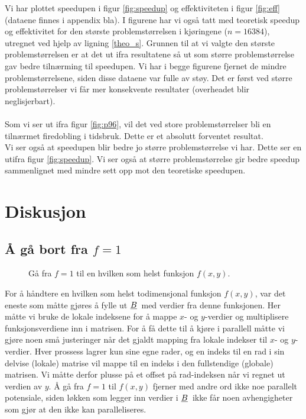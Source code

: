 \documentclass{article}
\newcommand{\ub}[1]{\underbar{$#1$}\,}
\begin{document}
Vi har plottet speedupen i figur \ref{fig:speedup} og effektiviteten i figur \ref{fig:eff} (dataene finnes i appendix bla). I figurene har vi også tatt med teoretisk speedup og effektivitet for den største problemstørrelsen i kjøringene ($n = 16384$), utregnet ved hjelp av ligning \ref{theo_s}. Grunnen til at vi valgte den største problemstørrelsen er at det ut ifra resultatene så ut som større problemstørrelse gav bedre tilnærming til speedupen. Vi har i begge figurene fjernet de mindre problemstørrelsene, siden disse dataene var fulle av støy. Det er først ved større problemstørrelser vi får mer konsekvente resultater (overheadet blir neglisjerbart).\\
\\

Som vi ser ut ifra figur \ref{fig:p96}, vil det ved store problemstørrelser bli en tilnærmet firedobling i tidsbruk. Dette er et absolutt forventet resultat. \\

Vi ser også at speedupen blir bedre jo større problemstørrelse vi har. Dette ser en utifra figur \ref{fig:speedup}. Vi ser også at større problemstørrelse gir bedre speedup sammenlignet med mindre sett opp mot den teoretiske speedupen.  


\section{Diskusjon}


\subsection{Å gå bort fra $f=1$}
\begin{figure}[h]
	\centering
	
	\caption{Gå fra $f=1$ til en hvilken som helst funksjon $f(x, y)$.}
	\label{fig:local_f}
\end{figure}
For å håndtere en hvilken som helst todimensjonal funksjon $f(x, y)$, var det eneste som måtte gjøres å fylle ut $\ub{B}$ med verdier fra denne funksjonen. Her måtte vi bruke de lokale indeksene for å mappe $x$- og $y$-verdier og multiplisere funksjonsverdiene inn i matrisen. For å få dette til å kjøre i parallell måtte vi gjøre noen små justeringer når det gjaldt mapping fra lokale indekser til $x$- og $y$-verdier. Hver prossess lagrer kun sine egne rader, og en indeks til en rad i sin delvise (lokale) matrise vil mappe til en indeks i den fullstendige (globale) matrisen. Vi måtte derfor plusse på et offset på rad-indeksen når vi regnet ut verdien av $y$. Å gå fra $f=1$ til $f(x, y)$ fjerner med andre ord ikke noe parallelt potensiale, siden løkken som legger inn verdier i $\ub{B}$ ikke får noen avhengigheter som gjør at den ikke kan paralleliseres.
\end{document}
